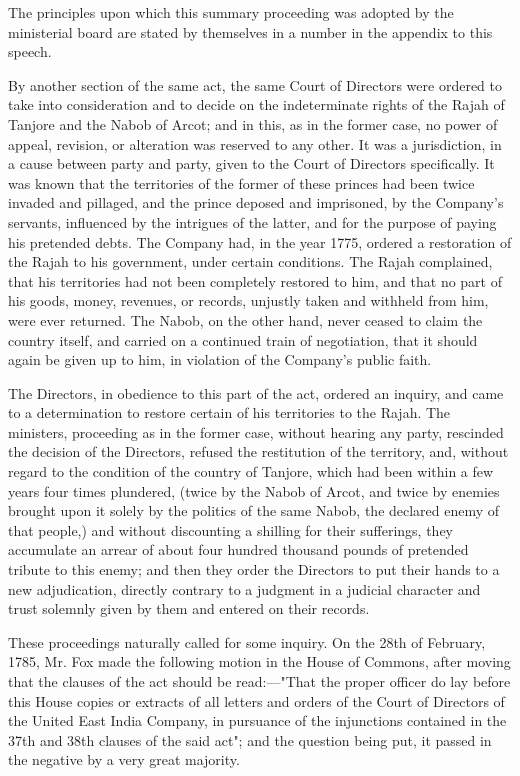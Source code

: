 The principles upon which this summary proceeding was adopted by the ministerial board are stated by themselves in a number in the appendix to this speech.

By another section of the same act, the same Court of Directors were ordered to take into consideration and to decide on the indeterminate rights of the Rajah of Tanjore and the Nabob of Arcot; and in this, as in the former case, no power of appeal, revision, or alteration was reserved to any other. It was a jurisdiction, in a cause between party and party, given to the Court of Directors specifically. It was known that the territories of the former of these princes had been twice invaded and pillaged, and the prince deposed and imprisoned, by the Company's servants, influenced by the intrigues of the latter, and for the purpose of paying his pretended debts. The Company had, in the year 1775, ordered a restoration of the Rajah to his government, under certain conditions. The Rajah complained, that his territories had not been completely restored to him, and that no part of his goods, money, revenues, or records, unjustly taken and withheld from him, were ever returned. The Nabob, on the other hand, never ceased to claim the country itself, and carried on a continued train of negotiation, that it should again be given up to him, in violation of the Company's public faith.

The Directors, in obedience to this part of the act, ordered an inquiry, and came to a determination to restore certain of his territories to the Rajah. The ministers, proceeding as in the former case, without hearing any party, rescinded the decision of the Directors, refused the restitution of the territory, and, without regard to the condition of the country of Tanjore, which had been within a few years four times plundered, (twice by the Nabob of Arcot, and twice by enemies brought upon it solely by the politics of the same Nabob, the declared enemy of that people,) and without discounting a shilling for their sufferings, they accumulate an arrear of about four hundred thousand pounds of pretended tribute to this enemy; and then they order the Directors to put their hands to a new adjudication, directly contrary to a judgment in a judicial character and trust solemnly given by them and entered on their records.

These proceedings naturally called for some inquiry. On the 28th of February, 1785, Mr. Fox made the following motion in the House of Commons, after moving that the clauses of the act should be read:—"That the proper officer do lay before this House copies or extracts of all letters and orders of the Court of Directors of the United East India Company, in pursuance of the injunctions contained in the 37th and 38th clauses of the said act"; and the question being put, it passed in the negative by a very great majority.

